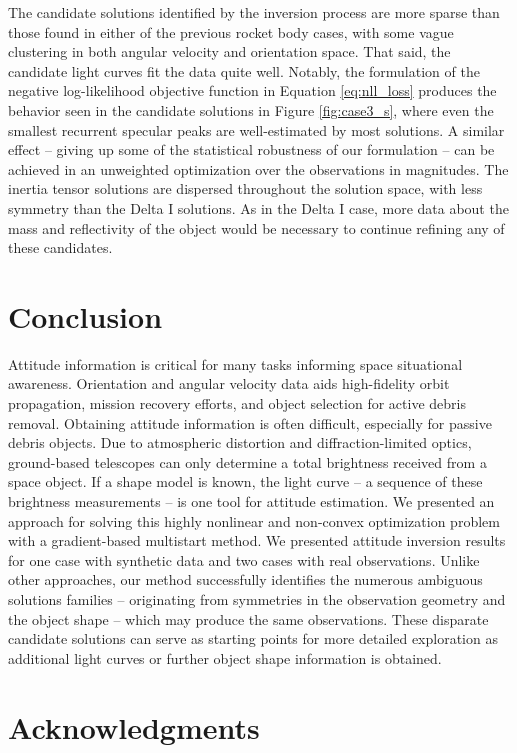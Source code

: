 \documentclass[a4paper,twocolumn]{spaceDebrisC} %
\begin{document}
The candidate solutions identified by the inversion process are more sparse than those found in either of the previous rocket body cases, with some vague clustering in both angular velocity and orientation space. That said, the candidate light curves fit the data quite well. Notably, the formulation of the negative log-likelihood objective function in Equation \ref{eq:nll_loss} produces the behavior seen in the candidate solutions in Figure \ref{fig:case3_s}, where even the smallest recurrent specular peaks are well-estimated by most solutions. A similar effect -- giving up some of the statistical robustness of our formulation -- can be achieved in an unweighted optimization over the observations in magnitudes. The inertia tensor solutions are dispersed throughout the solution space, with less symmetry than the Delta I solutions. As in the Delta I case, more data about the mass and reflectivity of the object would be necessary to continue refining any of these candidates.

\section{Conclusion}

Attitude information is critical for many tasks informing space situational awareness. Orientation and angular velocity data aids high-fidelity orbit propagation, mission recovery efforts, and object selection for active debris removal. Obtaining attitude information is often difficult, especially for passive debris objects. Due to atmospheric distortion and diffraction-limited optics, ground-based telescopes can only determine a total brightness received from a space object. If a shape model is known, the light curve -- a sequence of these brightness measurements -- is one tool for attitude estimation. We presented an approach for solving this highly nonlinear and non-convex optimization problem with a gradient-based multistart method. We presented attitude inversion results for one case with synthetic data and two cases with real observations. Unlike other approaches, our method successfully identifies the numerous ambiguous solutions families -- originating from symmetries in the observation geometry and the object shape -- which may produce the same observations. These disparate candidate solutions can serve as starting points for more detailed exploration as additional light curves or further object shape information is obtained.

\section*{Acknowledgments}
\end{document}
